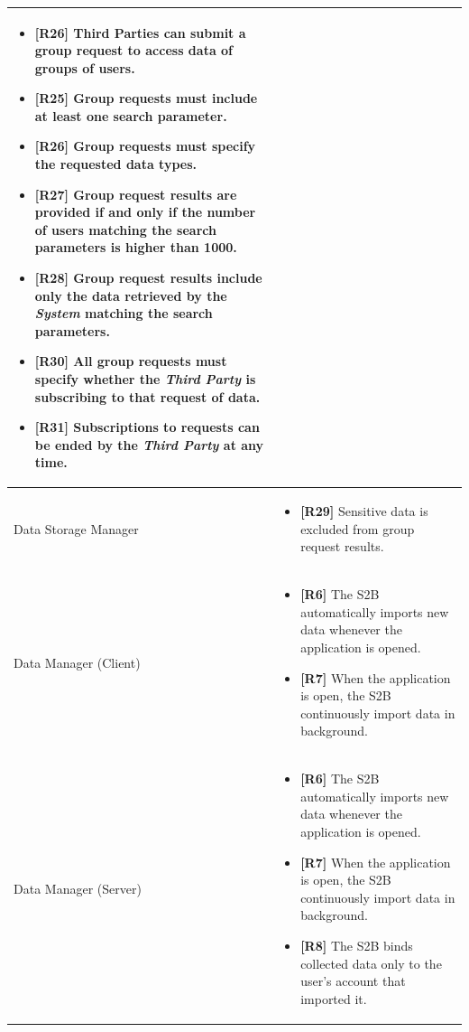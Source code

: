 \documentclass[titlepage]{article}
\begin{document}
\begin{longtable}{| p{5 cm} | p{8 cm} |}
\begin{itemize}
			\item {\bf [R26]} Third Parties can submit a group request to access data of groups of users. 
			\item {\bf [R25]} Group requests must include at least one search parameter. 
			\item {\bf [R26]} Group requests must specify the requested data types. 
			\item {\bf [R27]} Group request results are provided if and only if the number of users matching the search parameters is higher than 1000. 
			\item {\bf [R28]} Group request results include only the data retrieved by the {\it System} matching the search parameters. 
			\item {\bf [R30]} All group requests must specify whether the {\it Third Party} is subscribing to that request of data. 
			\item {\bf [R31]} Subscriptions to requests can be ended by the {\it Third Party} at any time.
		\end{itemize}		
		\\	 \hline
		\newline Data Storage Manager & 
		\begin{itemize}
			\item {\bf [R29]} Sensitive data is excluded from group request results. 
		\end{itemize}		
		\\	 \hline	
		\newline Data Manager (Client) & 
		\begin{itemize}
			\item {\bf [R6]} The S2B automatically imports new data whenever the application is opened.
			\item {\bf [R7]} When the application is open, the S2B continuously import data in background.
		\end{itemize}		
		\\	 \hline	
		\newline Data Manager (Server) & 
		\begin{itemize}
			\item {\bf [R6]} The S2B automatically imports new data whenever the application is opened.
			\item {\bf [R7]} When the application is open, the S2B continuously import data in background.
			\item {\bf [R8]} The S2B binds collected data only to the user’s account that imported it. 
		\end{itemize}		

\end{longtable}
\end{document}
